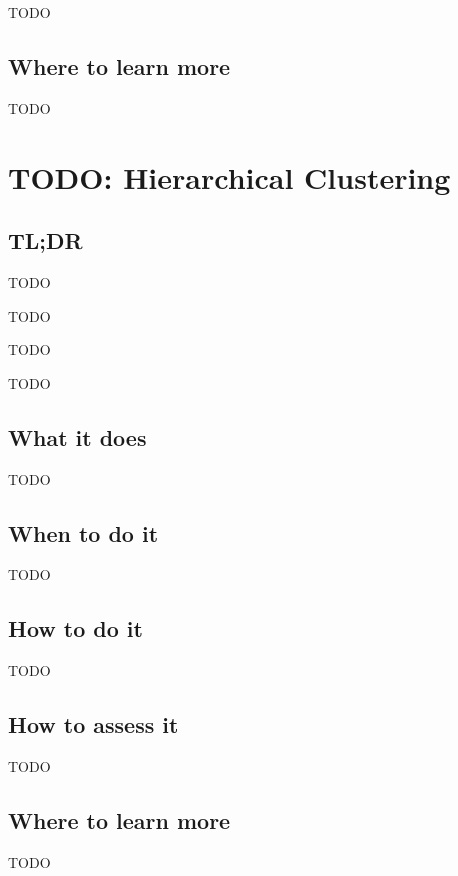 \documentclass[
]{book}
\providecommand{\tightlist}{%
  \setlength{\itemsep}{0pt}\setlength{\parskip}{0pt}}
\begin{document}
TODO

\hypertarget{where-to-learn-more-21}{%
\section{Where to learn more}\label{where-to-learn-more-21}}

TODO

\hypertarget{hierarchical-clustering}{%
\chapter{TODO: Hierarchical Clustering}\label{hierarchical-clustering}}

\hypertarget{tldr-22}{%
\section{TL;DR}\label{tldr-22}}

\begin{description}
\tightlist
\item[What it does]
TODO
\item[When to do it]
TODO
\item[How to do it]
TODO
\item[How to assess it]
TODO
\end{description}

\hypertarget{what-it-does-22}{%
\section{What it does}\label{what-it-does-22}}

TODO

\hypertarget{when-to-do-it-22}{%
\section{When to do it}\label{when-to-do-it-22}}

TODO

\hypertarget{how-to-do-it-22}{%
\section{How to do it}\label{how-to-do-it-22}}

TODO

\hypertarget{how-to-assess-it-22}{%
\section{How to assess it}\label{how-to-assess-it-22}}

TODO

\hypertarget{where-to-learn-more-22}{%
\section{Where to learn more}\label{where-to-learn-more-22}}

TODO

  
\end{document}
